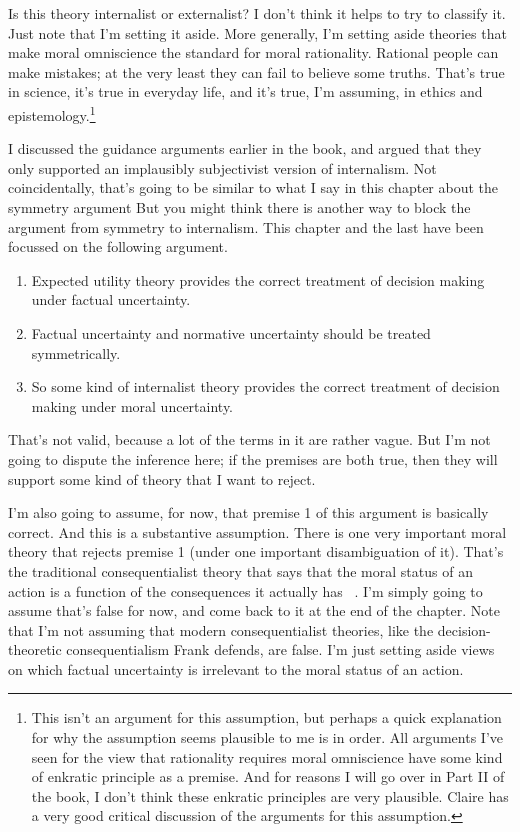 Is this theory internalist or externalist? I don't think it helps to try to classify it. Just note that I'm setting it aside. More generally, I'm setting aside theories that make moral omniscience the standard for moral rationality. Rational people can make mistakes; at the very least they can fail to believe some truths. That's true in science, it's true in everyday life, and it's true, I'm assuming, in ethics and epistemology.\footnote{This isn't an argument for this assumption, but perhaps a quick explanation for why the assumption seems plausible to me is in order. All arguments I've seen for the view that rationality requires moral omniscience have some kind of enkratic principle as a premise. And for reasons I will go over in Part II of the book, I don't think these enkratic principles are very plausible. Claire \citet{Field2017} has a very good critical discussion of the arguments for this assumption.}

I discussed the guidance arguments earlier in the book, and argued that they only supported an implausibly subjectivist version of internalism. Not coincidentally, that's going to be similar to what I say in this chapter about the symmetry argument But you might think there is another way to block the argument from symmetry to internalism. This chapter and the last have been focussed on the following argument.

\begin{enumerate}
\item{} Expected utility theory provides the correct treatment of decision making under factual uncertainty.

\item{} Factual uncertainty and normative uncertainty should be treated symmetrically.

\item{} So some kind of internalist theory provides the correct treatment of decision making under moral uncertainty.

\end{enumerate}
That's not valid, because a lot of the terms in it are rather vague. But I'm not going to dispute the inference here; if the premises are both true, then they will support some kind of theory that I want to reject.

I'm also going to assume, for now, that premise 1 of this argument is basically correct. And this is a substantive assumption. There is one very important moral theory that rejects premise 1 (under one important disambiguation of it). That's the traditional consequentialist theory that says that the moral status of an action is a function of the consequences it actually has ~\citep{Sidgwick1874, Smart1961}. I'm simply going to assume that's false for now, and come back to it at the end of the chapter. Note that I'm not assuming that modern consequentialist theories, like the decision-theoretic consequentialism \gls{Frank} \citet{Jackson1991} defends, are false. I'm just setting aside views on which factual uncertainty is irrelevant to the moral status of an action.

